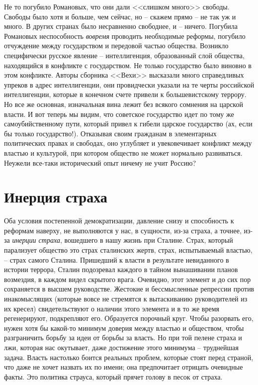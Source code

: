 \documentclass{book}
\begin{document}
Не то погубило Романовых, что они дали <<слишком много>> свободы. Свободы было хотя и больше, чем сейчас, но -- ска­жем прямо -- не так уж и много. В других странах было не­сравненно свободнее, и -- ничего. Погубила Романовых неспо­собность \textit{вовремя}  проводить необходимые реформы, погуби­ло отчуждение между государством и передовой частью обще­ства. Возникло специфически русское явление -- интеллиген­ция, образованный слой общества, находящийся в конфликте с государством. Не только государство было виновно в этом конфликте. Авторы сборника <<Вехи>> высказали много спра­ведливых упреков в адрес интеллигенции, они провидчески указали на те черты российской интеллигенции, которые в ко­нечном счете привели к большевистскому террору. Но все же основная, изначальная вина лежит без всякого сомнения на царской власти. И вот теперь мы видим, что советское государство идет по тому же самоубийственному пути, который привел к гибели царское государство (ах, если бы только государство!). Отказывая своим гражданам 
в элементарных политических правах и свободах, оно углубляет и увековечивает конфликт между властью и культурой, при котором общество не может нормально развиваться. Неужели все-таки исторический опыт ничему не учит Россию?



\section{Инерция страха}

Оба условия постепенной демократизации, давление снизу и способность к реформам наверху, не выполняются у нас, в сущности, из-за страха, а точнее, из-за \textit{инерции страха},  вошедшего в нашу жизнь при Сталине. Страх, который парализует общество это страх сталинских жертв, страх, испытываемый властью, -- страх самого Сталина. Пришедший к власти в результате невиданного в истории террора, Сталин подозревал каждого в тайном вынашивании планов возмездия, в каждом видел скрытого врага. Очевидно, этот элемент и до сих пор сохраняется в высшем руководстве. Жестокие и бессмысленные репрессии против инакомыслящих (которые вовсе не стремятся к вытаскиванию руководителей из их кресел) свидетельствуют о наличии этого элемента и в то же время регенерируют, подкрепляют его. Образуется порочный круг. Чтобы разорвать его, нужен хотя бы какой-то минимум доверия между властью и обществом, чтобы разграничить борьбу за идеи от борьбы за власть. Но при той пелене страха и лжи, которая нас окутывает, даже достижение этого 
минимума -- 
труднейшая задача. Власть настолько боится реальных проблем, которые стоят перед страной, что даже не хочет назвать их по имени; она предпочитает отрицать очевидные факты. Это политика страуса, который прячет голову в песок от страха.
\end{document}
